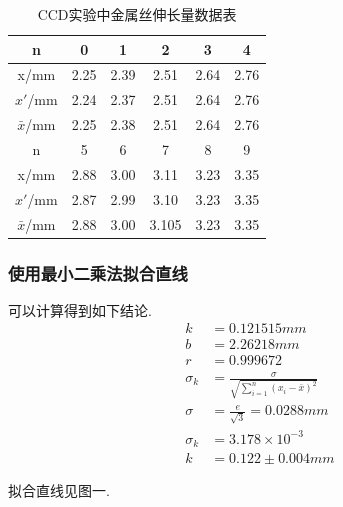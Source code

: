 \documentclass[a4paper,10pt,notitlepage]{article}
\begin{document}
\begin{center}

	\begin{longtable}{|c|c|c|c|c|c|}
	\caption{CCD实验中金属丝伸长量数据表} \\
	\hline
	n & 0 & 1 & 2 & 3 & 4 \\
	\hline
	x/mm & 2.25 & 2.39 & 2.51 & 2.64 & 2.76 \\
	\hline
	$x'$/mm & 2.24 & 2.37 & 2.51 & 2.64 & 2.76 \\
	\hline
	$\bar{x}$/mm & 2.25 & 2.38 & 2.51 & 2.64 & 2.76 \\
	\hline
	\hline
	n & 5 & 6 & 7 & 8 & 9 \\
	\hline
	x/mm & 2.88 & 3.00 & 3.11 & 3.23 & 3.35 \\
	\hline
	$x'$/mm & 2.87 & 2.99 & 3.10 & 3.23 & 3.35 \\
	\hline
	$\bar{x}$/mm & 2.88 & 3.00 & 3.105 & 3.23 & 3.35 \\
	\hline
	\end{longtable}

\end{center}

\subsubsection{使用最小二乘法拟合直线}

	可以计算得到如下结论. \\

\begin{align*}
	k &= 0.121515 mm \\
	b &= 2.26218 mm \\
	r &= 0.999672 \\
	\sigma_k &= \frac{\sigma}{\sqrt{\sum_{i = 1}^n (x_i - \bar{x})^2}} \\
	\sigma &= \frac{e}{\sqrt{3}} = 0.0288 mm \\
	\sigma_k &= 3.178 \times 10^{-3} \\
	k &= 0.122 \pm 0.004 mm
\end{align*}

	拟合直线见图一. \\
	
\end{document}
